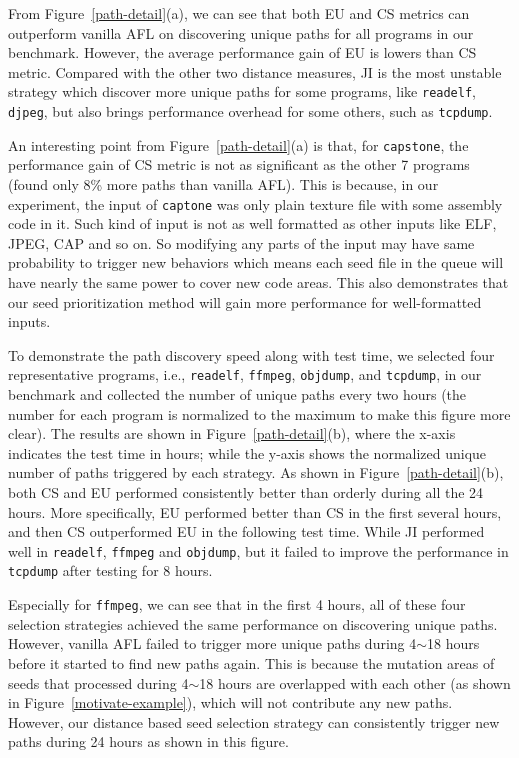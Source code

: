 \documentclass{cta-author}
\begin{document}
From Figure~\ref{path-detail}(a), we can see that both EU and CS metrics 
can outperform vanilla AFL on discovering unique paths for all programs 
in our benchmark. However, the average performance gain of EU is 
lowers than CS metric. 
Compared with the other two distance measures, JI is the most unstable 
strategy which discover more unique paths for some programs, like 
\texttt{readelf}, \texttt{djpeg}, but also brings performance overhead 
for some others, such as \texttt{tcpdump}.

An interesting point from Figure~\ref{path-detail}(a) is that, for 
\texttt{capstone}, the performance gain of CS metric is not as 
significant as the other 7 programs (found only 8\% more paths 
than vanilla AFL).
This is because, in our experiment, the input of \texttt{captone} 
was only plain texture file with some assembly code in it. Such kind 
of input is not as well formatted as other inputs like ELF, JPEG, 
CAP and so on. 
So modifying any parts of the input may have same probability to
trigger new behaviors which means each seed file in the queue 
will have nearly the same power to cover new code areas. This 
also demonstrates that our seed prioritization method will gain 
more performance for well-formatted inputs.

To demonstrate the path discovery speed along with test time, 
we selected four representative programs, i.e., \texttt{readelf}, 
\texttt{ffmpeg}, \texttt{objdump}, and \texttt{tcpdump}, in our 
benchmark and collected the number of unique paths every two 
hours (the number for each program is normalized to the 
maximum to make this figure more clear).
The results are shown in Figure~\ref{path-detail}(b), where 
the x-axis indicates the test time in hours; while the y-axis 
shows the normalized unique number of paths triggered 
by each strategy.
As shown in Figure~\ref{path-detail}(b), both CS and EU performed 
consistently better than orderly during all the 24 hours.
More specifically, EU performed better than CS in the first 
several hours, and then CS outperformed EU in the following test time.
While JI performed well in \texttt{readelf}, \texttt{ffmpeg} and 
\texttt{objdump}, but it failed to improve the performance in 
\texttt{tcpdump} after testing for 8 hours.

Especially for \texttt{ffmpeg}, we can see that in the first 4 hours, 
all of these four selection strategies achieved the same 
performance on discovering unique paths. However, vanilla AFL 
failed to trigger more unique paths during 4$\sim$18 
hours before it started to find new paths again.
This is because the mutation areas of seeds that processed 
during 4$\sim$18 hours are overlapped with each other 
(as shown in Figure~\ref{motivate-example}), which will not 
contribute any new paths. However, our distance based 
seed selection strategy can consistently trigger new paths 
during 24 hours as shown in this figure.
\end{document}
